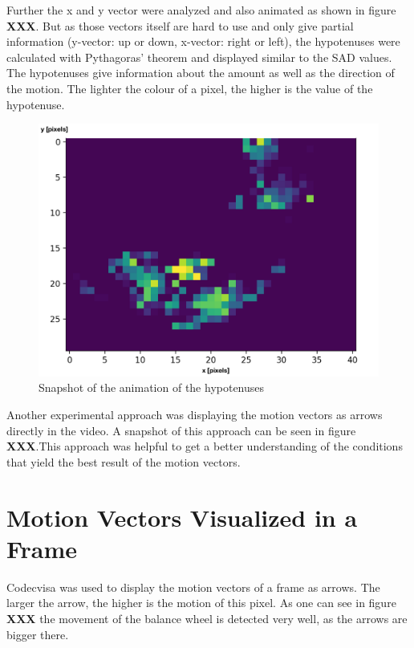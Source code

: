 \documentclass[12pt, a4paper]{report}
\begin{document}
    Further the x and y vector were analyzed and also animated as shown in figure \textbf{XXX}. But as those vectors itself are hard to use and only give partial information (y-vector: up or down, x-vector: right or left), the hypotenuses were calculated with Pythagoras' theorem and displayed similar to the SAD values. The hypotenuses give information about the amount as well as the direction of the motion. The lighter the colour of a pixel, the higher is the value of the hypotenuse.
    
    \noindent
    \begin{figure}[H]
    \centering
    \includegraphics[scale=0.6]{Images/animation_hypotenuse.png}
    
    \caption{Snapshot of the animation of the hypotenuses}
    \end{figure}
    
    Another experimental approach was displaying the motion vectors as arrows directly in the video. A snapshot of this approach can be seen in figure \textbf{XXX}.This approach was helpful to get a better understanding of the conditions that yield the best result of the motion vectors.
    \pagebreak
    
    \section{Motion Vectors Visualized in a Frame}
    Codecvisa was used to display the motion vectors of a frame as arrows. The larger the arrow, the higher is the motion of this pixel. As one can see in figure \textbf{XXX} the movement of the balance wheel is detected very well, as the arrows are bigger there.
 
\end{document}
